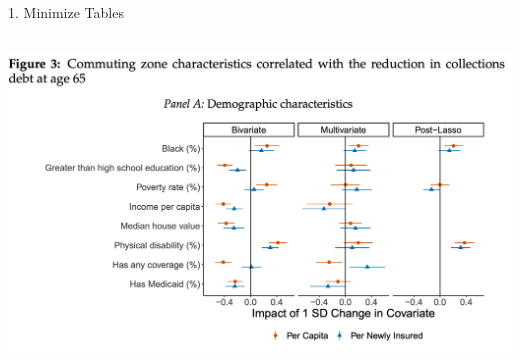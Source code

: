 \documentclass[notes,11pt, aspectratio=169]{beamer}
\begin{document}
\begin{frame}{1. Minimize Tables}
\begin{columns}[T]
\begin{column}{.5\textwidth}
{        \includegraphics[width=\linewidth]{gpw_figure.png}
      }
  \end{column}
\end{columns}
\end{frame}
\end{document}
